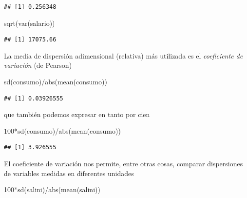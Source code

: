 \documentclass[
]{book}
\newenvironment{Shaded}{\begin{snugshade}}{\end{snugshade}}
\newcommand{\DecValTok}[1]{\textcolor[rgb]{0.00,0.00,0.81}{#1}}
\newcommand{\FunctionTok}[1]{\textcolor[rgb]{0.00,0.00,0.00}{#1}}
\newcommand{\NormalTok}[1]{#1}
\newcommand{\SpecialCharTok}[1]{\textcolor[rgb]{0.00,0.00,0.00}{#1}}
\theoremstyle{break}
\theoremstyle{nonumberplain}
\begin{document}
\begin{verbatim}
## [1] 0.256348
\end{verbatim}

\begin{Shaded}
\begin{Highlighting}[]
\FunctionTok{sqrt}\NormalTok{(}\FunctionTok{var}\NormalTok{(salario))}
\end{Highlighting}
\end{Shaded}

\begin{verbatim}
## [1] 17075.66
\end{verbatim}

La media de dispersión adimensional (relativa) más utilizada
es el \emph{coeficiente de variación} (de Pearson)

\begin{Shaded}
\begin{Highlighting}[]
\FunctionTok{sd}\NormalTok{(consumo)}\SpecialCharTok{/}\FunctionTok{abs}\NormalTok{(}\FunctionTok{mean}\NormalTok{(consumo))}
\end{Highlighting}
\end{Shaded}

\begin{verbatim}
## [1] 0.03926555
\end{verbatim}

que también podemos expresar en tanto por cien

\begin{Shaded}
\begin{Highlighting}[]
\DecValTok{100}\SpecialCharTok{*}\FunctionTok{sd}\NormalTok{(consumo)}\SpecialCharTok{/}\FunctionTok{abs}\NormalTok{(}\FunctionTok{mean}\NormalTok{(consumo))}
\end{Highlighting}
\end{Shaded}

\begin{verbatim}
## [1] 3.926555
\end{verbatim}

El coeficiente de variación nos permite, entre otras cosas, comparar dispersiones de
variables medidas en diferentes unidades

\begin{Shaded}
\begin{Highlighting}[]
\DecValTok{100}\SpecialCharTok{*}\FunctionTok{sd}\NormalTok{(salini)}\SpecialCharTok{/}\FunctionTok{abs}\NormalTok{(}\FunctionTok{mean}\NormalTok{(salini))}
\end{Highlighting}
\end{Shaded}
\end{document}
